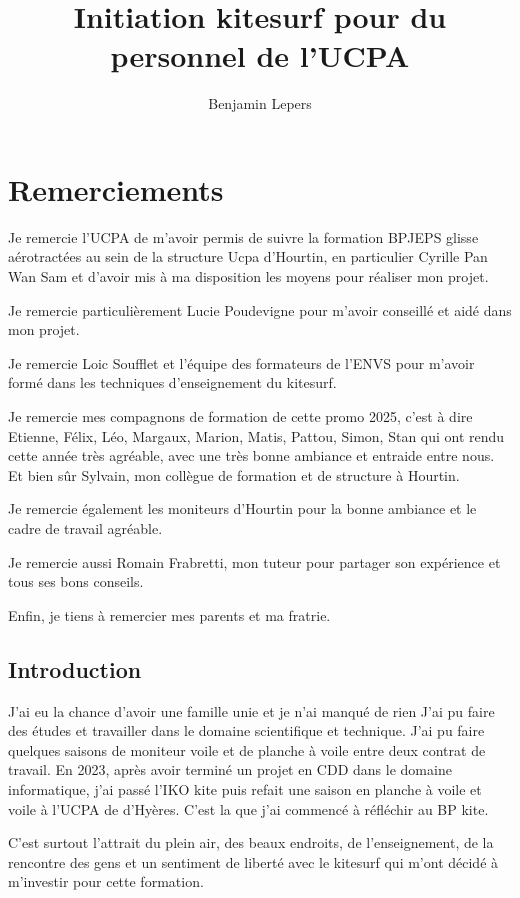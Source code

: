 \documentclass[12pt,a4paper]{report}
\begin{document}
\author{Benjamin Lepers}
\title{Initiation kitesurf pour du personnel de l'UCPA}
\maketitle
\chapter*{Remerciements}
Je remercie l'UCPA de m'avoir permis de suivre la formation
BPJEPS glisse aérotractées au sein de la structure Ucpa 
d'Hourtin, en particulier Cyrille Pan Wan Sam et d'avoir
mis à ma disposition les moyens pour réaliser mon projet.

Je remercie particulièrement Lucie Poudevigne pour m'avoir
conseillé et aidé dans mon projet.

Je remercie Loic Soufflet et l'équipe des formateurs de 
l'ENVS pour m'avoir formé dans les techniques d'enseignement
du kitesurf.

Je remercie mes compagnons de formation de cette promo 2025,
c'est à dire Etienne, Félix, Léo, Margaux, Marion, Matis, Pattou,
Simon, Stan qui ont rendu cette année très agréable,
avec une très bonne ambiance et entraide entre nous.
Et bien s\^ur Sylvain, mon collègue de formation et 
de structure à Hourtin.

Je remercie également les moniteurs d'Hourtin  pour la
bonne ambiance et le cadre de travail agréable.

Je remercie aussi Romain Frabretti, mon tuteur pour
partager son expérience et tous ses bons conseils.

Enfin, je tiens à remercier mes parents et ma fratrie.


\tableofcontents
\newpage
\section{Introduction}
J'ai eu la chance d'avoir une famille unie et je n'ai manqué de rien
J'ai pu faire des études et  travailler dans le domaine
scientifique et technique. J'ai pu  faire quelques 
saisons de moniteur voile et de planche à voile entre deux contrat 
de travail.
En 2023, après avoir terminé un projet
en CDD dans le domaine informatique, j'ai passé l'IKO kite\cite{iko}
puis refait une saison en planche à voile et voile à l'UCPA de 
d'Hyères. C'est la que j'ai commencé à réfléchir au BP kite.

C'est surtout l'attrait du plein air, des beaux endroits,
 de l'enseignement, de la rencontre
des gens et un sentiment de liberté avec le   kitesurf qui 
m'ont décidé à m'investir pour cette formation.
\end{document}
